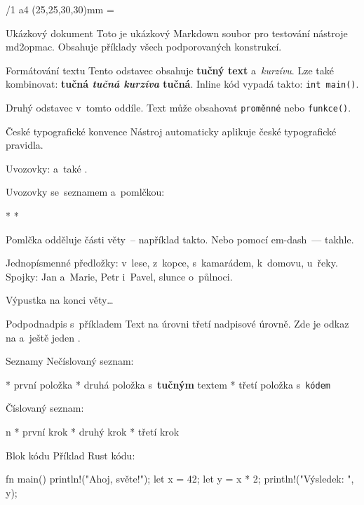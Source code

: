 \fontfam[LM]
\def\begcitation{\par\medskip\leftskip=2em\rightskip=2em\noindent}
\def\endcitation{\par\leftskip=0em\rightskip=0em\medskip}
\margins/1 a4 (25,25,30,30)mm
\footline={\hss\folio\hss}



\chap Ukázkový dokument
Toto je ukázkový Markdown soubor pro testování nástroje md2opmac.
Obsahuje příklady všech podporovaných konstrukcí.


\sec Formátování textu
Tento odstavec obsahuje {\bf tučný text} a~{\it kurzívu}. Lze také kombinovat:
{\bf tučná {\it tučná kurzíva} tučná}. Inline kód vypadá takto: {\tt int main()}.

Druhý odstavec v~tomto oddíle. Text může obsahovat {\tt proměnné} nebo {\tt funkce()}.


\sec České typografické konvence
Nástroj automaticky aplikuje české typografické pravidla.

Uvozovky:  a~také .

Uvozovky se~seznamem a~pomlčkou:

\begitems
* 
* 
\enditems

Pomlčka odděluje části věty~-- například takto. Nebo pomocí em-dash~--- takhle.

Jednopísmenné předložky: v~lese, z~kopce, s~kamarádem, k~domovu, u~řeky.
Spojky: Jan a~Marie, Petr i~Pavel, slunce o~půlnoci.

Výpustka na konci věty\dots{}


\secc Podpodnadpis s~příkladem
Text na úrovni třetí nadpisové úrovně. Zde je odkaz na
 a~ještě jeden
.


\sec Seznamy
Nečíslovaný seznam:

\begitems
* první položka
* druhá položka s~{\bf tučným} textem
* třetí položka s~{\tt kódem}
\enditems

Číslovaný seznam:

\begitems \style n
* první krok
* druhý krok
* třetí krok
\enditems


\sec Blok kódu
Příklad Rust kódu:

\begtt
fn main() {
    println!("Ahoj, světe!");
    let x = 42;
    let y = x * 2;
    println!("Výsledek: {}", y);
}
\endtt

